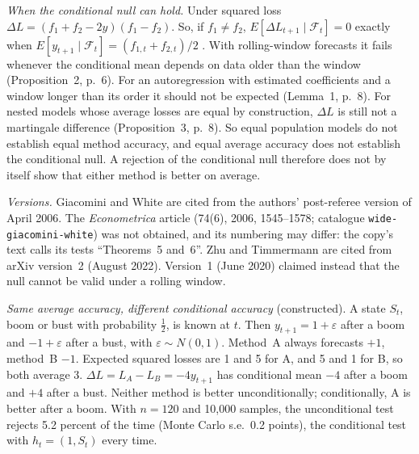 \begin{qfmethod}
\emph{When the conditional null can hold.} Under squared loss $\Delta L=(f_1+f_2-2y)(f_1-f_2)$. So, if $f_1\neq f_2$, $E[\Delta L_{t+1}\mid\mathcal F_t]=0$ exactly when $E[y_{t+1}\mid\mathcal F_t]=(f_{1,t}+f_{2,t})/2$ \citep[Proposition~1, p.~5]{zhu-timmermann-2022-arxiv}. With rolling-window forecasts it fails whenever the conditional mean depends on data older than the window (Proposition~2, p.~6). For an autoregression with estimated coefficients and a window longer than its order it should not be expected (Lemma~1, p.~8). For nested models whose average losses are equal by construction, $\Delta L$ is still not a martingale difference (Proposition~3, p.~8). So equal population models do not establish equal method accuracy, and equal average accuracy does not establish the conditional null. A rejection of the conditional null therefore does not by itself show that either method is better on average.

\emph{Versions.} Giacomini and White are cited from the authors' post-referee version of April 2006. The \emph{Econometrica} article (74(6), 2006, 1545--1578; catalogue \nolinkurl{wide-giacomini-white}) was not obtained, and its numbering may differ: the copy's text calls its tests ``Theorems~5 and~6''. Zhu and Timmermann are cited from arXiv version~2 (August 2022). Version~1 (June 2020) claimed instead that the null cannot be valid under a rolling window.

 \emph{Same average accuracy, different conditional accuracy} (constructed). A state $S_t$, boom or bust with probability $\tfrac12$, is known at $t$. Then $y_{t+1}=1+\varepsilon$ after a boom and $-1+\varepsilon$ after a bust, with $\varepsilon\sim N(0,1)$. Method~A always forecasts $+1$, method~B $-1$. Expected squared losses are 1 and 5 for A, and 5 and 1 for B, so both average 3. $\Delta L=L_A-L_B=-4y_{t+1}$ has conditional mean $-4$ after a boom and $+4$ after a bust. Neither method is better unconditionally; conditionally, A is better after a boom. With $n=120$ and 10,000 samples, the unconditional test rejects 5.2 percent of the time (Monte Carlo s.e.\ 0.2 points), the conditional test with $h_t=(1,S_t)$ every time.


\end{qfmethod}
